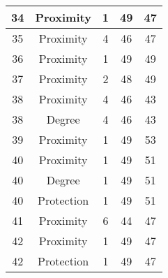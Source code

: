 \documentclass[results.tex]{subfiles}
\begin{document}
\begin{center}
\begin{tabular}{| c || c | c | c | c |}
            \hline
            34                      & Proximity                    & 1                      & 49                      & 47                   \\
            \hline
            35                      & Proximity                    & 4                      & 46                      & 47                   \\
            \hline
            36                      & Proximity                    & 1                      & 49                      & 49                   \\
            \hline
            37                      & Proximity                    & 2                      & 48                      & 49                   \\
            \hline
            38                      & Proximity                    & 4                      & 46                      & 43                   \\
            \hline
            38                      & Degree                       & 4                      & 46                      & 43                   \\
            \hline
            39                      & Proximity                    & 1                      & 49                      & 53                   \\
            \hline
            40                      & Proximity                    & 1                      & 49                      & 51                   \\
            \hline
            40                      & Degree                       & 1                      & 49                      & 51                   \\
            \hline
            40                      & Protection                   & 1                      & 49                      & 51                   \\
            \hline
            41                      & Proximity                    & 6                      & 44                      & 47                   \\
            \hline
            42                      & Proximity                    & 1                      & 49                      & 47                   \\
            \hline
            42                      & Protection                   & 1                      & 49                      & 47                   \\

\end{tabular}
\end{center}
\end{document}
